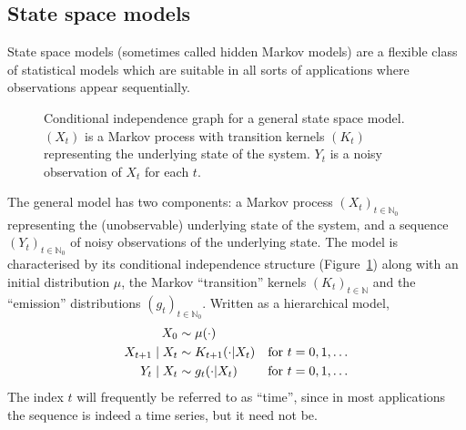 \subsection{State space models}
\label{sec:SSMs}
State space models (sometimes called hidden Markov models) are a flexible class of statistical models which are suitable in all sorts of applications where observations appear sequentially.
\begin{figure}[ht]
\centering
{}
\caption[State space model]{Conditional independence graph for a general state space model. $(X_t)$ is a Markov process with transition kernels $(K_t)$ representing the underlying state of the system. $Y_t$ is a noisy observation of $X_t$ for each $t$.}
\label{fig:SSM}
\end{figure}
The general model has two components: a Markov process $(X_t)_{t\in\mathbb{N}_0}$ representing the (unobservable) underlying state of the system, and a sequence $(Y_t)_{t\in\mathbb{N}_0}$ of noisy observations of the underlying state. The model is characterised by its conditional independence structure (Figure~\ref{fig:SSM}) along with an initial distribution $\mu$, the Markov ``transition'' kernels $(K_t)_{t\in\mathbb{N}}$ and the ``emission'' distributions $(g_t)_{t\in\mathbb{N}_0}$. 
Written as a hierarchical model,
\begin{align}
X_0 &\sim \mu(\cdot) & \notag\\
X_{t+1} \mid X_t &\sim K_{t+1}(\cdot | X_t) & \text{for } t=0, 1, \dots
        \label{eq:SSM_spec}\\
Y_t \mid X_t &\sim g_t(\cdot | X_t) & \text{for } t=0, 1, \dots \notag
\end{align}
The index $t$ will frequently be referred to as ``time'', since in most applications the sequence is indeed a time series, but it need not be.

